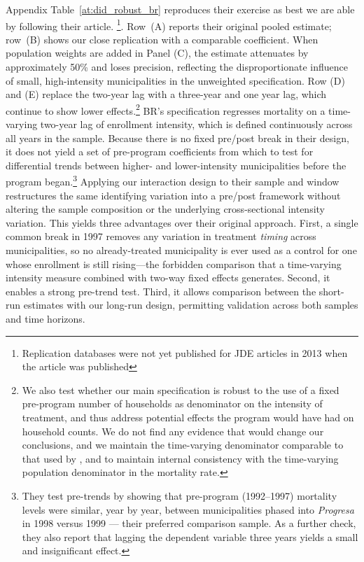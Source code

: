 \documentclass[12pt]{article}
\begin{document}
\p Appendix Table~\ref{at:did_robust_br} reproduces their exercise as best we are able by following their article. \footnote{Replication databases were not yet published for JDE articles in 2013 when the article was published}. Row~(A) reports their original pooled estimate; row~(B) shows our close replication with a comparable coefficient. When population weights are added in Panel (C), the estimate attenuates by approximately 50\% and loses precision, reflecting the disproportionate influence of small, high-intensity municipalities in the unweighted specification. Row (D) and (E) replace the two-year lag with a three-year and one year lag, which continue to show lower effects.\footnote{We also test whether our main specification is robust to the use of a fixed pre-program number of households as denominator on the intensity of treatment, and thus address potential effects the program would have had on household counts. We do not find any evidence that would change our conclusions, and we maintain the time-varying denominator comparable to that used by \cite{BarhamRowberry2013JDE}, and to maintain internal consistency with the time-varying population denominator in the mortality rate.}
\p BR's specification regresses mortality on a time-varying two-year lag of enrollment intensity, which is defined continuously across all years in the sample. Because there is no fixed pre/post break in their design, it does not yield a set of pre-program coefficients from which to test for differential trends between higher- and lower-intensity municipalities before the program began.\footnote{They test pre-trends by showing that pre-program (1992–1997) mortality levels were similar, year by year, between municipalities phased into \textit{Progresa} in 1998 versus 1999 — their preferred comparison sample. As a further check, they also report that lagging the dependent variable three years yields a small and insignificant effect.} Applying our interaction design to their sample and window restructures the same identifying variation into a pre/post framework without altering the sample composition or the underlying cross-sectional intensity variation. This yields three advantages over their original approach. First, a single common break in 1997 removes any variation in treatment \textit{timing} across municipalities, so no already-treated municipality is ever used as a control for one whose enrollment is still rising---the forbidden comparison that a time-varying intensity measure combined with two-way fixed effects generates. Second, it enables a strong pre-trend test. Third, it allows comparison between the short-run estimates with our long-run design, permitting validation across both samples and time horizons. 
\end{document}
